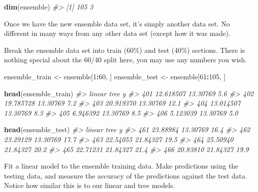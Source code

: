 \documentclass[
]{book}
\newenvironment{Shaded}{\begin{snugshade}}{\end{snugshade}}
\newcommand{\CommentTok}[1]{\textcolor[rgb]{0.56,0.35,0.01}{\textit{#1}}}
\newcommand{\DecValTok}[1]{\textcolor[rgb]{0.00,0.00,0.81}{#1}}
\newcommand{\FunctionTok}[1]{\textcolor[rgb]{0.13,0.29,0.53}{\textbf{#1}}}
\newcommand{\NormalTok}[1]{#1}
\newcommand{\OtherTok}[1]{\textcolor[rgb]{0.56,0.35,0.01}{#1}}
\newcommand{\SpecialCharTok}[1]{\textcolor[rgb]{0.81,0.36,0.00}{\textbf{#1}}}
\begin{document}
\begin{Shaded}
\begin{Highlighting}[]
\FunctionTok{dim}\NormalTok{(ensemble)}
\CommentTok{\#\textgreater{} [1] 105   3}
\end{Highlighting}
\end{Shaded}

Once we have the new ensemble data set, it's simply another data set. No
different in many ways from any other data set (except how it was made).

Break the ensemble data set into train (60\%) and test (40\%) sections.
There is nothing special about the 60/40 split here, you may use any
numbers you wish.

\begin{Shaded}
\begin{Highlighting}[]
\NormalTok{ensemble\_train }\OtherTok{\textless{}{-}}\NormalTok{ ensemble[}\DecValTok{1}\SpecialCharTok{:}\DecValTok{60}\NormalTok{, ]}
\NormalTok{ensemble\_test }\OtherTok{\textless{}{-}}\NormalTok{ ensemble[}\DecValTok{61}\SpecialCharTok{:}\DecValTok{105}\NormalTok{, ]}

\FunctionTok{head}\NormalTok{(ensemble\_train)}
\CommentTok{\#\textgreater{}        linear     tree    y}
\CommentTok{\#\textgreater{} 401 12.618507 13.30769  5.6}
\CommentTok{\#\textgreater{} 402 19.785728 13.30769  7.2}
\CommentTok{\#\textgreater{} 403 20.919370 13.30769 12.1}
\CommentTok{\#\textgreater{} 404 13.014507 13.30769  8.3}
\CommentTok{\#\textgreater{} 405  6.946392 13.30769  8.5}
\CommentTok{\#\textgreater{} 406  5.123039 13.30769  5.0}
\end{Highlighting}
\end{Shaded}

\begin{Shaded}
\begin{Highlighting}[]
\FunctionTok{head}\NormalTok{(ensemble\_test)}
\CommentTok{\#\textgreater{}       linear     tree    y}
\CommentTok{\#\textgreater{} 461 23.88984 13.30769 16.4}
\CommentTok{\#\textgreater{} 462 23.29129 13.30769 17.7}
\CommentTok{\#\textgreater{} 463 22.54055 21.84327 19.5}
\CommentTok{\#\textgreater{} 464 25.50940 21.84327 20.2}
\CommentTok{\#\textgreater{} 465 22.71231 21.84327 21.4}
\CommentTok{\#\textgreater{} 466 20.83810 21.84327 19.9}
\end{Highlighting}
\end{Shaded}

Fit a linear model to the ensemble training data. Make predictions using
the testing data, and measure the accuracy of the predictions against
the test data. Notice how similar this is to our linear and tree models.
\end{document}
